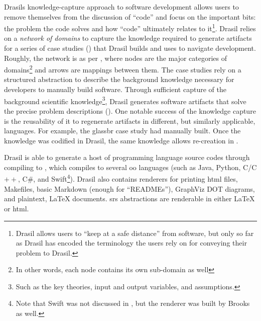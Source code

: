 \roughNetworkOfDomains{}

Drasils knowledge-capture approach to software development allows users to
remove themselves from the discussion of ``code'' and focus on the important
bits: the problem the code solves and how ``code'' ultimately relates to
it\footnote{Drasil allows users to ``keep at a safe distance'' from software,
but only so far as Drasil has encoded the terminology the users rely on for
conveying their problem to Drasil.}. Drasil relies on a \textit{network of
domains} \cite{Czarnecki2005} to capture the knowledge required to generate
artifacts for a series of case studies () that Drasil
builds and uses to navigate development. Roughly, the network is as per
, where nodes are the major categories of
domains\footnote{In other words, each node contains its own sub-domain as well}
and arrows are mappings between them. The case studies rely on a structured
 \cite{SmithAndLai2005} abstraction to describe the background
knowledge necessary for developers to manually build software. Through
sufficient capture of the background scientific knowledge\footnote{Such as the
key theories, input and output variables, and assumptions.}, Drasil generates
software artifacts that solve the precise problem descriptions
(). One notable success of the knowledge capture is
the reusability of it to regenerate artifacts in different, but similarly
applicable, languages. For example, the \acs{glassbr} case study had
manually built. Once the knowledge was codified in Drasil, the same knowledge
allows re-creation in .

\caseStudiesTable{}

Drasil is able to generate a host of  programming language source codes
through compiling to  \cite{MacLachlan2020}, which compiles to several
\acs{oo} languages (such as Java, Python, C/C$++$, C\#, and Swift\footnote{Note
that Swift was not discussed in \cite{MacLachlan2020}, but the renderer was
built by Brooks as well.}). Drasil also contains renderers for printing
\acs{html} files, Makefiles, basic Markdown (enough for ``READMEs''), GraphViz
DOT \cite{Gansner1993} diagrams, and plaintext, \LaTeX{} documents. \acs{srs}
abstractions are renderable in either \LaTeX{} or \acs{html}.

